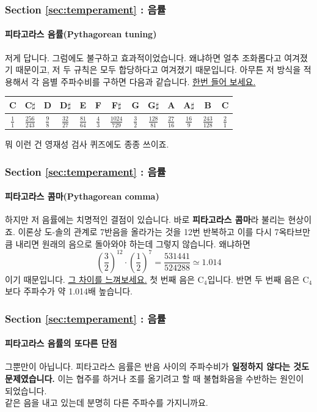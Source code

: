 \documentclass{beamer}
\begin{document}
	\begin{frame}
		\frametitle{Section \ref{sec:temperament} : 음률}
		\framesubtitle{피타고라스 음률(Pythagorean tuning)}
		저게 답니다. 그럼에도 불구하고 효과적이었습니다. 왜냐하면 얼추 조화롭다고 여겨졌기 때문이고, 저 두 규칙은 모두 합당하다고 여겨졌기 때문입니다. 아무튼 저 방식을 적용해서 각 음별 주파수비를 구하면 다음과 같습니다. {\color{cyan}\href{run:res/mp3/5/pythagorean/p_temperament.mp3}{한번 들어 보세요.}}
		\begin{table}[!h]
			\centering
			\begin{tabular}{|c|c|c|c|c|c|c|c|c|c|c|c|c|}
				\hline
				C & C$\sharp$ & D & D$\sharp$ & E & F & F$\sharp$ & G & G$\sharp$ & A & A$\sharp$ & B & C \\ \hline
				$\frac{1}{1}$ &  $\frac{256}{243}$  & $\frac{9}{8}$ & $\frac{32}{27}$ & $\frac{81}{64}$ & $\frac{4}{3}$ & $\frac{1024}{729}$ & $\frac{3}{2}$ & $\frac{128}{81}$ & $\frac{27}{16}$ & $\frac{16}{9}$ & $\frac{243}{128}$ & $\frac{2}{1}$ \\ \hline
			\end{tabular}
		\end{table}
		뭐 이런 건 영재성 검사 퀴즈에도 종종 쓰이죠.
	\end{frame}
	
	\begin{frame}
		\frametitle{Section \ref{sec:temperament} : 음률}
		\framesubtitle{피타고라스 콤마(Pythagorean comma)}
		하지만 저 음률에는 치명적인 결점이 있습니다. 바로 {\bf 피타고라스 콤마}라 불리는 현상이죠. 이론상 도-솔의 관계로 7반음을 올라가는 것을 12번 반복하고 이를 다시 7옥타브만큼 내리면 원래의 음으로 돌아와야 하는데 그렇지 않습니다. 왜냐하면 $$ \left(\dfrac{3}{2}\right )^{12}\cdot\left(\dfrac{1}{2}\right)^7=\dfrac{531441}{524288}\simeq 1.014$$이기 때문입니다. {\color{cyan}\href{run:res/mp3/5/pythagorean/comma.mp3}{그 차이를 느껴보세요.}} 첫 번째 음은 C$_4$입니다. 반면 두 번째 음은 C$_4 $보다 주파수가 약 1.014배 높습니다.
	\end{frame}
	
	\begin{frame}
		\frametitle{Section \ref{sec:temperament} : 음률}
		\framesubtitle{피타고라스 음률의 또다른 단점}
		그뿐만이 아닙니다. 피타고라스 음률은 반음 사이의 주파수비가 {\bf 일정하지 않다는 것도 문제였습니다.} 이는 협주를 하거나 조를 옮기려고 할 때 불협화음을 수반하는 원인이 되었습니다. \\
		같은 음을 내고 있는데 분명히 다른 주파수를 가지니까요.
	\end{frame}
	
\end{document}

